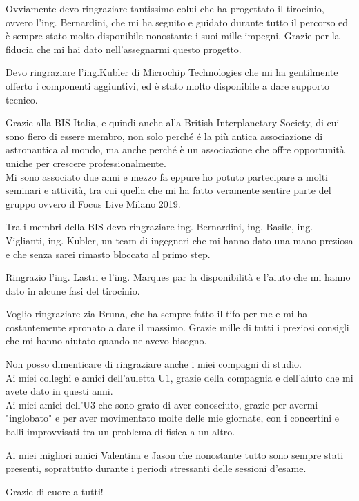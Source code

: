\documentclass[12pt, a4paper, titlepage, oneside]{book}
\begin{document}
Ovviamente devo ringraziare tantissimo colui che ha progettato il tirocinio, ovvero l'ing. Bernardini, che mi ha seguito e guidato durante tutto il percorso ed è sempre stato molto disponibile nonostante i suoi mille impegni. Grazie per la fiducia che mi hai dato nell'assegnarmi questo progetto.\newline


Devo ringraziare l'ing.Kubler di Microchip Technologies che mi ha gentilmente offerto i componenti aggiuntivi, ed è stato molto disponibile a dare supporto tecnico.\newline


Grazie alla BIS-Italia, e quindi anche alla British Interplanetary Society, di cui sono fiero di essere membro, non solo perché é la più antica associazione di astronautica al mondo, ma anche perché è un associazione che offre opportunità uniche per crescere professionalmente.\\
Mi sono associato due anni e mezzo fa eppure ho potuto partecipare a molti seminari e attività, tra cui quella che mi ha fatto veramente sentire parte del gruppo ovvero il Focus Live Milano 2019.\newline

Tra i membri della BIS devo ringraziare ing. Bernardini, ing. Basile, ing. Viglianti, ing. Kubler, un team di ingegneri che mi hanno dato una mano preziosa e che senza sarei rimasto bloccato al primo step.\newline

Ringrazio l'ing. Lastri e l'ing. Marques par la disponibilità e l'aiuto che mi hanno dato in alcune fasi del tirocinio.\newline

Voglio ringraziare zia Bruna, che ha sempre fatto il tifo per me e mi ha costantemente spronato a dare il massimo. Grazie mille di tutti i preziosi consigli che mi hanno aiutato quando ne avevo bisogno.\newline

Non posso dimenticare di ringraziare anche i miei compagni di studio. \\
Ai miei colleghi e amici dell'auletta U1, grazie della compagnia e dell'aiuto che mi avete dato in questi anni. \\
Ai miei amici dell'U3 che sono grato di aver conosciuto, grazie per avermi "inglobato" e per aver movimentato molte delle mie giornate, con i concertini e balli improvvisati tra un problema di fisica a un altro.\newline

Ai miei migliori amici Valentina e Jason che nonostante tutto sono sempre stati presenti, soprattutto durante i periodi stressanti delle sessioni d'esame. \newline

Grazie di cuore a tutti!
\end{document}
